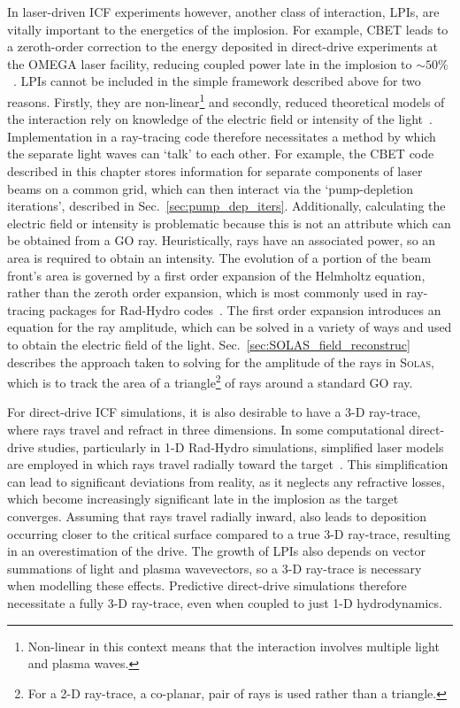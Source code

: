In laser-driven \ac{ICF} experiments however, another class of interaction, \ac{LPIs}, are vitally important to the energetics of the implosion.
For example, \ac{CBET} leads to a zeroth-order correction to the energy deposited in direct-drive experiments at the OMEGA laser facility, reducing coupled power late in the implosion to $\sim 50\%$~\cite{colaitis_inverse_2021}.
\ac{LPIs} cannot be included in the simple framework described above for two reasons.
Firstly, they are non-linear\footnote{Non-linear in this context means that the interaction involves multiple light and plasma waves.} and secondly, reduced theoretical models of the interaction rely on knowledge of the electric field or intensity of the light~\cite{randall_theory_1981}.
Implementation in a ray-tracing code therefore necessitates a method by which the separate light waves can `talk' to each other.
For example, the \ac{CBET} code described in this chapter stores information for separate components of laser beams on a common grid, which can then interact via the `pump-depletion iterations', described in Sec.~\ref{sec:pump_dep_iters}.
Additionally, calculating the electric field or intensity is problematic because this is not an attribute which can be obtained from a \ac{GO} ray.
Heuristically, rays have an associated power, so an area is required to obtain an intensity.
The evolution of a portion of the beam front's area is governed by a first order expansion of the Helmholtz equation, rather than the zeroth order expansion, which is most commonly used in ray-tracing packages for \ac{Rad-Hydro} codes~\cite{colaitis_towards_2014}.
The first order expansion introduces an equation for the ray amplitude, which can be solved in a variety of ways and used to obtain the electric field of the light.
Sec.~\ref{sec:SOLAS_field_reconstruc} describes the approach taken to solving for the amplitude of the rays in \textsc{Solas}, which is to track the area of a triangle\footnote{For a 2-D ray-trace, a co-planar, pair of rays is used rather than a triangle.} of rays around a standard \ac{GO} ray.

For direct-drive \ac{ICF} simulations, it is also desirable to have a 3-D ray-trace, where rays travel and refract in three dimensions.
In some computational direct-drive studies, particularly in 1-D \ac{Rad-Hydro} simulations, simplified laser models are employed in which rays travel radially toward the target~\cite{paddock_one-dimensional_2021}.
This simplification can lead to significant deviations from reality, as it neglects any refractive losses, which become increasingly significant late in the implosion as the target converges.
Assuming that rays travel radially inward, also leads to deposition occurring closer to the critical surface compared to a true 3-D ray-trace, resulting in an overestimation of the drive.
The growth of \ac{LPIs} also depends on vector summations of light and plasma wavevectors, so a 3-D ray-trace is necessary when modelling these effects.
Predictive direct-drive simulations therefore necessitate a fully 3-D ray-trace, even when coupled to just 1-D hydrodynamics.


